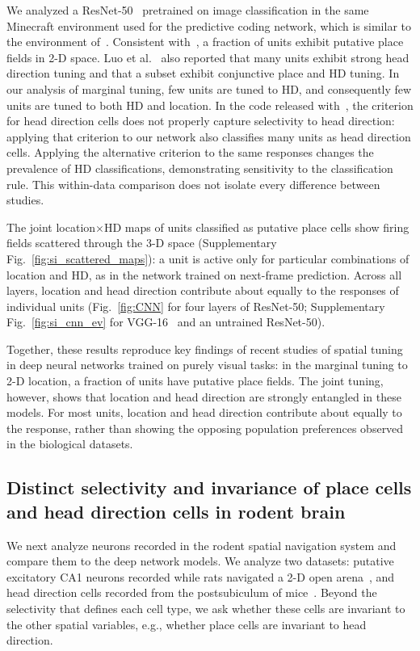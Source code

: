 \documentclass[11pt]{article}
\begin{document}
We analyzed a ResNet-50~\cite{He2016} pretrained on image classification in the same Minecraft environment used for the predictive coding network, which is similar to the environment of~\cite{Luo2024}. Consistent with~\cite{Luo2024}, a fraction of units exhibit putative place fields in 2-D space. Luo et al.~\cite{Luo2024} also reported that many units exhibit strong head direction tuning and that a subset exhibit conjunctive place and HD tuning. In our analysis of marginal tuning, few units are tuned to HD, and consequently few units are tuned to both HD and location. In the code released with~\cite{Luo2024}, the criterion for head direction cells does not properly capture selectivity to head direction: applying that criterion to our network also classifies many units as head direction cells. Applying the alternative criterion to the same responses changes the prevalence of HD classifications, demonstrating sensitivity to the classification rule. This within-data comparison does not isolate every difference between studies.

The joint location$\times$HD maps of units classified as putative place cells show firing fields scattered through the 3-D space (Supplementary Fig.~\ref{fig:si_scattered_maps}): a unit is active only for particular combinations of location and HD, as in the network trained on next-frame prediction. Across all layers, location and head direction contribute about equally to the responses of individual units (Fig.~\ref{fig:CNN} for four layers of ResNet-50; Supplementary Fig.~\ref{fig:si_cnn_ev} for VGG-16~\cite{Simonyan2015} and an untrained ResNet-50).

Together, these results reproduce key findings of recent studies of spatial tuning in deep neural networks trained on purely visual tasks: in the marginal tuning to 2-D location, a fraction of units have putative place fields. The joint tuning, however, shows that location and head direction are strongly entangled in these models. For most units, location and head direction contribute about equally to the response, rather than showing the opposing population preferences observed in the biological datasets.

\FloatBarrier
\subsection{Distinct selectivity and invariance of place cells and head direction cells in rodent brain}

We next analyze neurons recorded in the rodent spatial navigation system and compare them to the deep network models. We analyze two datasets: putative excitatory CA1 neurons recorded while rats navigated a 2-D open arena~\cite{Pfeiffer2013}, and head direction cells recorded from the postsubiculum of mice~\cite{Duszkiewicz2024}. Beyond the selectivity that defines each cell type, we ask whether these cells are invariant to the other spatial variables, e.g., whether place cells are invariant to head direction.
\end{document}
